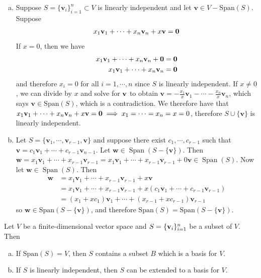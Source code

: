 \documentclass[12pt,letterpaper,reqno]{article}
\numberwithin{equation}{section}
\newcommand{\bv}{\mathbf{v}}
\newcommand{\bw}{\mathbf{w}}
\DeclareMathOperator{\Span}{Span}
\begin{document}
\begin{pf}
	\begin{enumerate}[(a)]
		\item Suppose $S=\{\bv_i\}_{i=1}^n \subset V$ is linearly independent and let $\bv \in V-\text{Span}(S)$. Suppose 
		\begin{align*}
			x_1\bv_1+\cdots+x_n\bv_n+x\bv={\bf 0} 
		\end{align*}
If $x=0$, then we have
\begin{align*}
			x_1\bv_1+\cdots+x_n\bv_n+{\bf 0}&={\bf 0}  \\
			x_1\bv_1+\cdots+x_n\bv_n &={\bf 0}  \\
		\end{align*}
and therefore $x_i=0$ for all $i=1,\cdots,n$ since $S$ is linearly independent. If $x \neq 0$, we can divide by $x$ and solve for ${\bf v}$ to obtain $\bv=-\frac{x_1}{x}\bv_1-\cdots -\frac{x_n}{x} \bv_n$, which says $\bv \in \text{Span}(S)$, which is a contradiction. We therefore have that $x_1\bv_1+\cdots+x_n\bv_n+x\bv={\bf 0} \implies x_1=\cdots=x_n=x=0$, therefore $S\cup \{\bv \}$ is linearly independent. 
\item Let $S=\{\bv_1,\cdots, \bv_{r-1}, \bv\}$ and suppose there exist $c_1,\cdots,c_{r-1}$ such that $\bv=c_1\bv_1+\cdots+c_{r-1} \bv_{n-1}$.	Let $\bw \in \Span(S-\{\bv \})$. Then $\bw =x_1\bv_1+\cdots+x_{r-1}\bv_{r-1}=x_1\bv_1+\cdots+x_{r-1}\bv_{r-1}+0 \bv \in \Span(S)$. Now let $\bw \in \Span(S)$. Then 
\begin{align*}
	\bw&=x_1\bv_1+\cdots+x_{r-1}\bv_{r-1}+x\bv \\
	&=x_1\bv_1+\cdots+x_{r-1}\bv_{r-1}+x(c_1\bv_1+\cdots+c_{r-1}\bv_{r-1}) \\
	&=(x_1+xc_1)\bv_1+\cdots+(x_{r-1}+xc_{r-1})\bv_{r-1}
\end{align*} 
so $\bw \in \text{Span}(S-\{\bv\})$, and therefore $\text{Span}(S)=\text{Span}(S-\{\bv\})$.
\end{enumerate}
\end{pf}

\begin{thm}\label{thm:every_f_d_v_s_has_a_basis}
	Let $V$ be a finite-dimensional vector space and $S=\{{\bf v}_i\}_{i=1}^n$ be a subset of $V$. Then
\begin{enumerate}[(a)]
	\item If $\text{Span}(S)=V$, then $S$ contains a subset $B$ which is a basis for $V$.
	\item If $S$ is linearly independent, then $S$ can be extended to a basis for $V$. 
\end{enumerate}
\end{thm}
\end{document}
